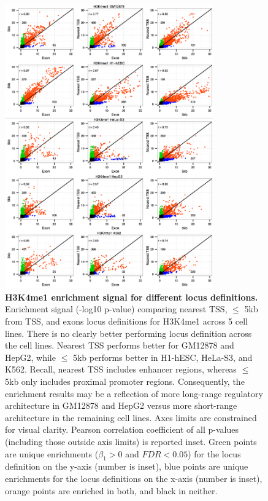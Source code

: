 \newpage

\begin{figure}[ht!]
\centering
\includegraphics[width=0.8\textwidth]{chap2figs/figure2_10.pdf}
\caption[H3K4me1 enrichment signal for different locus definitions.]
{
\textbf{H3K4me1 enrichment signal for different locus definitions.} Enrichment signal (-log10 p-value) comparing nearest TSS, $\leq$ 5kb from TSS, and exons locus definitions for H3K4me1 across 5 cell lines. There is no clearly better performing locus definition across the cell lines. Nearest TSS performs better for GM12878 and HepG2, while $\leq$ 5kb performs better in H1-hESC, HeLa-S3, and K562. Recall, nearest TSS includes enhancer regions, whereas $\leq$ 5kb only includes proximal promoter regions. Consequently, the enrichment results may be a reflection of more long-range regulatory architecture in GM12878 and HepG2 versus more short-range architecture in the remaining cell lines. Axes limits are constrained for visual clarity. Pearson correlation coefficient of all p-values (including those outside axis limits) is reported inset. Green points are unique enrichments ($\beta_1 > 0$ and $FDR < 0.05$) for the locus definition on the y-axis (number is inset), blue points are unique enrichments for the locus definitions on the x-axis (number is inset), orange points are enriched in both, and black in neither.
}
\label{chap2:fig:10}
\end{figure}
